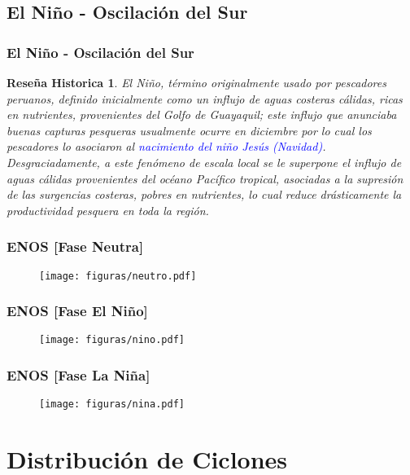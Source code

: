 \documentclass{beamer}
\newtheorem{Th1}{Reseña Historica}
\begin{document}
\subsection{El Niño - Oscilación del Sur}
\begin{frame}
\frametitle{El Niño - Oscilación del Sur}
\begin{Th1}
El Niño, término originalmente usado por pescadores peruanos, definido inicialmente como un influjo de aguas costeras cálidas, ricas en nutrientes, provenientes del Golfo de Guayaquil; este influjo que anunciaba buenas capturas pesqueras usualmente ocurre en diciembre por lo cual los pescadores lo asociaron al \textcolor{blue}{nacimiento del niño Jesús (Navidad)}. Desgraciadamente, a este fenómeno de escala local se le superpone el influjo de aguas cálidas provenientes del océano Pacífico tropical, asociadas a la supresión de las surgencias costeras, pobres en nutrientes, lo cual reduce drásticamente la productividad pesquera en toda la región.
\end{Th1}
\end{frame} 

\begin{frame}
\frametitle{ENOS [Fase Neutra]}
\begin{figure}[!hbt]
   \centering
   \texttt{[image: figuras/neutro.pdf]}
\end{figure}
\end{frame}

\begin{frame}
\frametitle{ENOS [Fase El Niño]}
\begin{figure}[!hbt]
   \centering
   \texttt{[image: figuras/nino.pdf]}
\end{figure}
\end{frame}

\begin{frame}
\frametitle{ENOS [Fase La Niña]}
\begin{figure}[!hbt]
   \centering
   \texttt{[image: figuras/nina.pdf]}
\end{figure}
\end{frame}

\section{Distribución de Ciclones}
\end{document}
